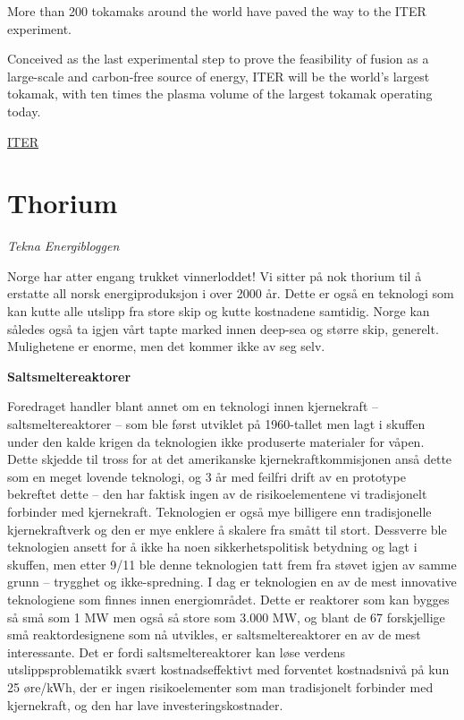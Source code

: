 \documentclass[
]{book}
\begin{document}
More than 200 tokamaks around the world have paved the way to the ITER experiment.

Conceived as the last experimental step to prove the feasibility of fusion as a large-scale and carbon-free source of energy, ITER will be the world's largest tokamak, with ten times the plasma volume of the largest tokamak operating today.

\href{https://www.iter.org/proj/iterhistory}{ITER}

\hypertarget{thorium}{%
\section{Thorium}\label{thorium}}

\emph{Tekna Energibloggen}

Norge har atter engang trukket vinnerloddet! Vi sitter på nok thorium til å erstatte all norsk energiproduksjon i over 2000 år. Dette er også en teknologi som kan kutte alle utslipp fra store skip og kutte kostnadene samtidig. Norge kan således også ta igjen vårt tapte marked innen deep-sea og større skip, generelt. Mulighetene er enorme, men det kommer ikke av seg selv.

\textbf{Saltsmeltereaktorer}

Foredraget handler blant annet om en teknologi innen kjernekraft -- saltsmeltereaktorer -- som ble først utviklet på 1960-tallet men lagt i skuffen under den kalde krigen da teknologien ikke produserte materialer for våpen. Dette skjedde til tross for at det amerikanske kjernekraftkommisjonen anså dette som en meget lovende teknologi, og 3 år med feilfri drift av en prototype bekreftet dette -- den har faktisk ingen av de risikoelementene vi tradisjonelt forbinder med kjernekraft. Teknologien er også mye billigere enn tradisjonelle kjernekraftverk og den er mye enklere å skalere fra smått til stort. Dessverre ble teknologien ansett for å ikke ha noen sikkerhetspolitisk betydning og lagt i skuffen, men etter 9/11 ble denne teknologien tatt frem fra støvet igjen av samme grunn -- trygghet og ikke-spredning. I dag er teknologien en av de mest innovative teknologiene som finnes innen energiområdet. Dette er reaktorer som kan bygges så små som 1 MW men også så store som 3.000 MW, og blant de 67 forskjellige små reaktordesignene som nå utvikles, er saltsmeltereaktorer en av de mest interessante. Det er fordi saltsmeltereaktorer kan løse verdens utslippsproblematikk svært kostnadseffektivt med forventet kostnadsnivå på kun 25 øre/kWh, der er ingen risikoelementer som man tradisjonelt forbinder med kjernekraft, og den har lave investeringskostnader.
\end{document}
